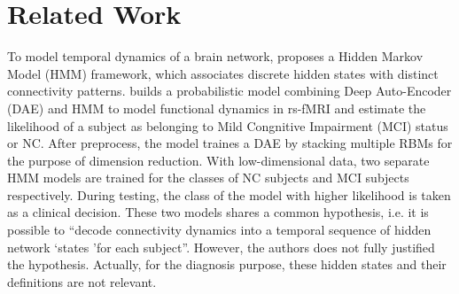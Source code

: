 \section{Related Work}

To model temporal dynamics of a brain network, \cite{eavani13} proposes a Hidden Markov Model (HMM) framework, which associates discrete hidden states with distinct connectivity patterns. \cite{suk16} builds a probabilistic model combining Deep Auto-Encoder (DAE) and HMM to model functional dynamics in rs-fMRI and estimate the likelihood of a subject as belonging to Mild Congnitive Impairment (MCI) status or NC. After preprocess, the model traines a DAE by stacking multiple RBMs for the purpose of dimension reduction. With low-dimensional data, two separate HMM models are trained for the classes of NC subjects and MCI subjects respectively. During testing, the class of the model with higher likelihood is taken as a clinical decision. These two models shares a common hypothesis, i.e. it is possible to \textquotedblleft decode connectivity dynamics into a temporal sequence of hidden network \textquoteleft states \textquoteright for each subject\textquotedblright \cite{eavani13}. However, the authors does not fully justified the hypothesis. Actually, for the diagnosis purpose, these hidden states and their definitions are not relevant.
